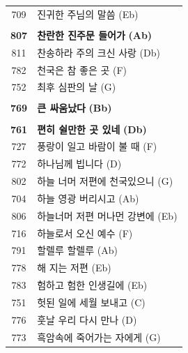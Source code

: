 \begin{supertabular}{c l}
709 & 진귀한 주님의 말씀 (Eb) \\
 & \\
\textbf{807} & \textbf{찬란한 진주문 들어가} \textbf{(Ab)} \\
811 & 찬송하라 주의 크신 사랑 (Db) \\
782 & 천국은 참 좋은 곳 (F) \\
752 & 최후 심판의 날 (G) \\
 & \\
\textbf{769} & \textbf{큰 싸움났다} \textbf{(Bb)} \\
 & \\
\textbf{761} & \textbf{편히 쉴만한 곳 있네} \textbf{(Db)} \\
727 & 풍랑이 일고 바람이 불 때 (F) \\
772 & 하나님께 빕니다 (D) \\
802 & 하늘 너머 저편에 천국있으니 (G) \\
704 & 하늘 영광 버리시고 (Ab) \\
806 & 하늘너머 저편 머나먼 강변에 (Eb) \\
716 & 하늘로서 오신 예수 (F) \\
791 & 할렐루 할렐루 (Ab) \\
778 & 해 지는 저편 (Eb) \\
783 & 험하고 험한 인생길에 (Eb) \\
751 & 헛된 일에 세월 보내고 (C) \\
776 & 훗날 우리 다시 만나 (D) \\
773 & 흑암속에 죽어가는 자에게 (G) \\
\end{supertabular}
\clearpage


